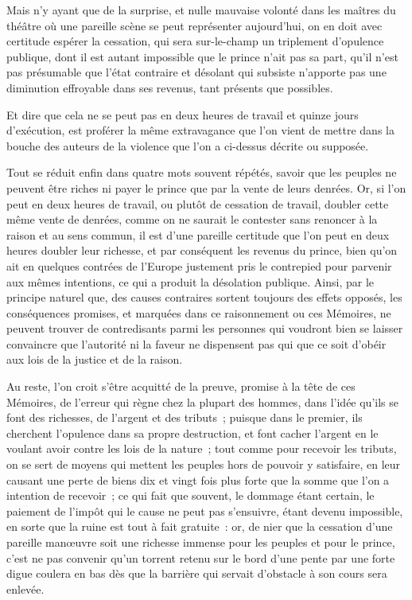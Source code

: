 \documentclass[french,twoside]{book} %
\begin{document}
Mais n’y ayant que de la surprise, et nulle mauvaise volonté dans les maîtres du théâtre où une pareille scène se peut représenter aujourd’hui, on en doit avec certitude espérer la cessation, qui sera sur-le-champ un triplement d’opulence publique, dont il est autant impossible que le prince n’ait pas sa part, qu’il n’est pas présumable que l’état contraire et désolant qui subsiste n’apporte pas une diminution effroyable dans ses revenus, tant présents que possibles.\par
Et dire que cela ne se peut pas en deux heures de travail et quinze jours d’exécution, est proférer la même extravagance que l’on vient de mettre dans la bouche des auteurs de la violence que l’on a ci-dessus décrite ou supposée.\par
Tout se réduit enfin dans quatre mots souvent répétés, savoir que les peuples ne peuvent être riches ni payer le prince que par la vente de leurs denrées. Or, si l’on peut en deux heures de travail, ou plutôt de cessation de travail, doubler cette même vente de denrées, comme on ne saurait le contester sans renoncer à la raison et au sens commun, il est d’une pareille certitude que l’on peut en deux heures doubler leur richesse, et par conséquent les revenus du prince, bien qu’on ait en quelques contrées de l’Europe justement pris le contrepied pour parvenir aux mêmes intentions, ce qui a produit la désolation publique. Ainsi, par le principe naturel que, des causes contraires sortent toujours des effets opposés, les conséquences promises, et marquées dans ce raisonnement ou ces Mémoires, ne peuvent trouver de contredisants parmi les personnes qui voudront bien se laisser convaincre que l’autorité ni la faveur ne dispensent pas qui que ce soit d’obéir aux lois de la justice et de la raison.\par
Au reste, l’on croit s’être acquitté de la preuve, promise à la tête de ces Mémoires, de l’erreur qui règne chez la plupart des hommes, dans l’idée qu’ils se font des richesses, de l’argent et des tributs ; puisque dans le premier, ils cherchent l’opulence dans sa propre destruction, et font cacher l’argent en le voulant avoir contre les lois de la nature ; tout comme pour recevoir les tributs, on se sert de moyens qui mettent les peuples hors de pouvoir y satisfaire, en leur causant une perte de biens dix et vingt fois plus forte que la somme que l’on a intention de recevoir ; ce qui fait que souvent, le dommage étant certain, le paiement de l’impôt qui le cause ne peut pas s’ensuivre, étant devenu impossible, en sorte que la ruine est tout à fait gratuite : or, de nier que la cessation d’une pareille manœuvre soit une richesse immense pour les peuples et pour le prince, c’est ne pas convenir qu’un torrent retenu sur le bord d’une pente par une forte digue coulera en bas dès que la barrière qui servait d’obstacle à son cours sera enlevée.\par
\end{document}
